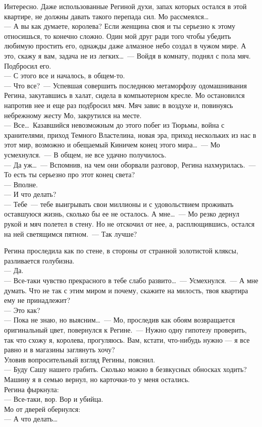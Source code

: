 Интересно. Даже использованные Региной духи, запах которых остался в этой 
квартире, не должны давать такого перепада сил. Мо рассмеялся\ldots\\
--- А вы как думаете, королева? Если женщина своя и ты серьезно к этому 
относишься, то конечно сложно. Один мой друг ради того чтобы убедить любимую 
простить его, однажды даже алмазное небо создал в чужом мире. А это, скажу я 
вам, задача не из легких\ldots~--- Войдя в комнату, поднял с пола мяч. 
Подбросил его.\\
--- С этого все и началось, в общем-то.\\
--- Что все?~--- Успевшая совершить последнюю метаморфозу одомашнивания Регина, 
закутавшись в халат, сидела в компьютерном кресле. Мо остановился напротив нее 
и 
еще раз подбросил мяч. Мяч завис в воздухе и, повинуясь небрежному жесту Мо, 
закрутился на месте.\\
--- Все\ldots\ Казавшийся невозможным до этого побег из Тюрьмы, война с 
хранителями, приход Темного Властелина, новая эра, приход нескольких из нас в 
этот мир, возможно и обещаемый Киничем конец этого мира\ldots~--- Мо 
усмехнулся.~--- В общем, не все удачно получилось.\\
--- Да уж\ldots~--- Вспомнив, на чем они оборвали разговор, Регина 
нахмурилась.~--- То есть ты серьезно про этот конец света?\\
--- Вполне.\\
--- И что делать?\\
--- Тебе~--- тебе выигрывать свои миллионы и с удовольствием проживать 
оставшуюся жизнь, сколько бы ее не осталось. А мне\ldots~--- Мо резко 
дернул рукой и мяч полетел в стену. Но не отскочил от нее, а, расплющившись, 
остался на ней светящимся пятном.~--- Так лучше?

Регина проследила как по стене, в стороны от странной золотистой кляксы, 
разливается голубизна.\\
--- Да.\\
--- Все-таки чувство прекрасного в тебе слабо развито\ldots~--- 
Усмехнулся.~--- А мне думать. Что не так с этим миром и почему, скажите на 
милость, твоя квартира ему не принадлежит?\\
--- Это как?\\
--- Пока не знаю, но выясним\ldots~--- Мо, проследив как обоям 
возвращается оригинальный цвет, повернулся к Регине.~--- Нужно одну гипотезу 
проверить, так что схожу я, королева, прогуляюсь. Вам, кстати, что-нибудь нужно 
--- я все равно и в магазины заглянуть хочу?\\
Уловив вопросительный взгляд Регины, пояснил.\\
--- Буду Сашу нашего грабить. Сколько можно в безвкусных обносках ходить? 
Машину я в семью вернул, но карточки-то у меня остались.\\
Регина фыркнула:\\
--- Все-таки, вор. Вор и убийца.\\
Мо от дверей обернулся:\\
--- А что делать\ldots

